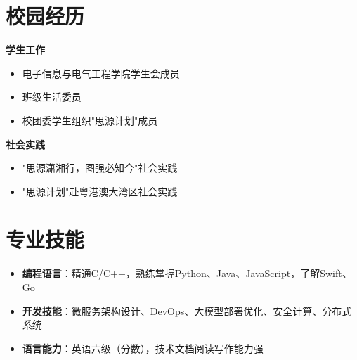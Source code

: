 \documentclass[a4paper]{article}
\begin{document}
\section*{校园经历}
\begin{minipage}{0.48\textwidth}
\textbf{学生工作}
\begin{itemize}[leftmargin=*,itemsep=0.1em,topsep=0.1em]
\item 电子信息与电气工程学院学生会成员
\item 班级生活委员
\item 校团委学生组织"思源计划"成员
\end{itemize}
\end{minipage}
\begin{minipage}{0.48\textwidth}
\textbf{社会实践}
\begin{itemize}[leftmargin=*,itemsep=0.1em,topsep=0.1em]
\item "思源潇湘行，图强必知今"社会实践
\item "思源计划"赴粤港澳大湾区社会实践
\end{itemize}
\end{minipage}

\section*{专业技能}
\begin{itemize}[leftmargin=*,itemsep=0.2em,topsep=0.2em]
\item \textbf{编程语言}：精通C/C++，熟练掌握Python、Java、JavaScript，了解Swift、Go
\item \textbf{开发技能}：微服务架构设计、DevOps、大模型部署优化、安全计算、分布式系统
\item \textbf{语言能力}：英语六级（分数），技术文档阅读写作能力强
\end{itemize}
\end{document}
